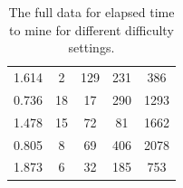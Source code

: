 \documentclass{l4proj}
\begin{document}
\begin{appendices}
\begin{table}[!ht]
\begin{tabular}{ccccc}
    1.614      & 2          & 129        & 231        & 386        \\
    0.736      & 18         & 17         & 290        & 1293       \\
    1.478      & 15         & 72         & 81         & 1662       \\
    0.805      & 8          & 69         & 406        & 2078       \\
    1.873      & 6          & 32         & 185        & 753       
    \end{tabular}
    \vspace{1cm}
    \caption{
        The full data for elapsed time to mine for different difficulty settings.
    }
    \label{tab:mining}
\end{table}
\end{appendices}

\raggedright



\end{document}
